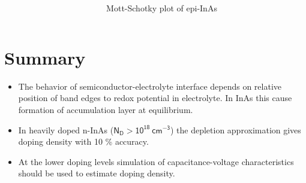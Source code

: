 \documentclass[final]{beamer}
\newcommand{\figfont}{\normalsize} %
\begin{document}
\begin{poster}
\begin{columns}[c]
        \begin{column}{0.005\columnwidth}
        \end{column}   
                   
        \begin{column}{\figwidth}
             \vspace{1ex} 
             \centering
             \figfont
             
             \caption{\hskip50pt Mott-Schotky plot of epi-InAs}  
        \end{column}
\end{columns}	

\section{Summary} \justifying
    \begin{itemize} \itemsep12pt
        \justifying
        \item The behavior of semiconductor-electrolyte interface depends on relative position of  band edges to redox potential in electrolyte. In InAs this cause formation of accumulation layer at equilibrium.
        \item     In heavily doped n-InAs ($\mathsf{N_D > 10^{18}\ cm^{-3}}$)  the depletion approximation gives doping density with 10  \% accuracy.
        \item At the lower doping levels simulation of capacitance-voltage characteristics should be used         to estimate doping density.
    \end{itemize}


\end{poster}
\end{document}
